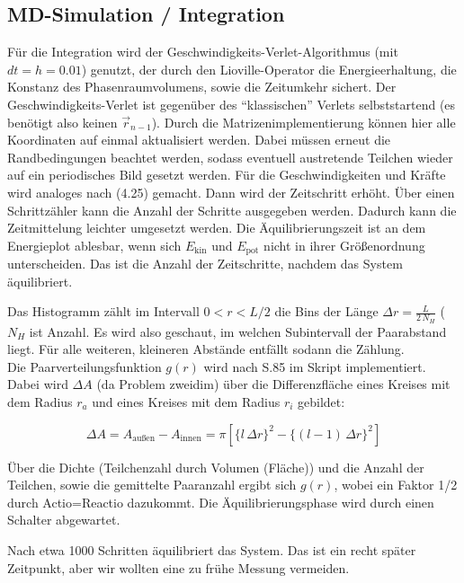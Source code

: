 \subsection*{MD-Simulation / Integration}
Für die Integration wird der Geschwindigkeits-Verlet-Algorithmus (mit $dt=h=0.01$) genutzt, der durch den Lioville-Operator die Energieerhaltung, die Konstanz des Phasenraumvolumens, sowie die Zeitumkehr sichert. Der Geschwindigkeits-Verlet ist gegenüber des \enquote{klassischen} Verlets selbststartend (es benötigt also keinen $\vec{r}_{n-1}$). Durch die Matrizenimplementierung können hier alle Koordinaten auf einmal aktualisiert werden. Dabei müssen erneut die Randbedingungen beachtet werden, sodass eventuell austretende Teilchen wieder auf ein periodisches Bild gesetzt werden. Für die Geschwindigkeiten und Kräfte wird analoges nach (4.25) gemacht. Dann wird der Zeitschritt erhöht. Über einen Schrittzähler kann die Anzahl der Schritte ausgegeben werden. Dadurch kann die Zeitmittelung leichter umgesetzt werden. Die Äquilibrierungszeit ist an dem Energieplot ablesbar, wenn sich $E_{\text{kin}}$ und $E_{\text{pot}}$ nicht in ihrer Größenordnung unterscheiden. Das ist die Anzahl der Zeitschritte, nachdem das System äquilibriert.

Das Histogramm zählt im Intervall $0<r<L/2$ die Bins der Länge $\Delta r = \frac{L}{2\,N_H}$ ($N_H$ ist Anzahl. Es wird also geschaut, im welchen Subintervall der Paarabstand liegt. Für alle weiteren, kleineren Abstände entfällt sodann die Zählung.\\

Die Paarverteilungsfunktion $g(r)$ wird nach S.85 im Skript implementiert. Dabei wird $\Delta A$ (da Problem zweidim) über die Differenzfläche eines Kreises mit dem Radius $r_a$ und eines Kreises mit dem Radius $r_i$ gebildet:

\begin{equation*}
\Delta A = A_{\text{außen}} - A_{\text{innen}} = \pi [\{l \, \Delta r\}^2-\{(l-1)\,\Delta r\}^2]
\end{equation*}

Über die Dichte (Teilchenzahl durch Volumen (Fläche)) und die Anzahl der Teilchen, sowie die gemittelte Paaranzahl ergibt sich $g(r)$, wobei ein Faktor 1/2 durch Actio=Reactio dazukommt. Die Äquilibrierungsphase wird durch einen Schalter abgewartet.

Nach etwa 1000 Schritten äquilibriert das System. Das ist ein recht später Zeitpunkt, aber wir wollten eine zu frühe Messung vermeiden.

